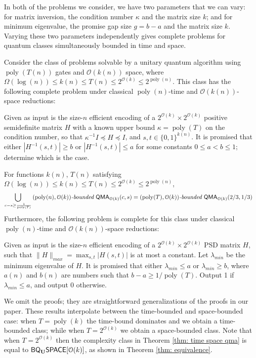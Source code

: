 \documentclass[a4paper,UKenglish]{lipics-v2016}
\newcommand\QMA{{\sf{QMA}}}
\newcommand\bddQMA[5]{{\left(#1,#2\right)}\textit{-bounded }\QMA_{#3}(#4,#5)}
\newcommand{\classfont}{\sf}
\newcommand{\Unitary}{\mathbf{U}}
\newcommand{\unitaryBQSPACE}[1]{{\classfont{BQ}_\Unitary\classfont{SPACE}}[#1]}
\newcommand\bigoh{\mathcal{O}}
\DeclareMathOperator{\poly}{poly}
\begin{document}
In both of the problems we consider, we have two parameters that we can vary: for matrix inversion, the condition number $\kappa$ and the matrix size $k$; and for minimum eigenvalue, the promise gap size $g=b-a$ and the matrix size $k$. Varying these two parameters independently gives complete problems for quantum classes simultaneously bounded in time and space.

\begin{theorem}
Consider the class of problems solvable by a unitary quantum algorithm using $\poly(T(n))$ gates and $\bigoh(k(n))$ space, where $\Omega(\log(n)) \le k(n) \le T(n) \le 2^{\bigoh(k)} \le 2^{\poly(n)}$. This class has the following complete problem under classical $\poly(n)$-time and $\bigoh(k(n))$-space reductions:

Given as input is the size-$n$ efficient encoding of a $2^{\bigoh(k)} \times 2^{\bigoh(k)}$ positive semidefinite matrix $H$ with a known upper bound $\kappa = \poly(T)$ on the condition number, so that $\kappa^{-1}I\preceq H \preceq I$, and $s,t\in \lbrace 0,1\rbrace^{k(n)}$. It is promised that either $|H^{-1}(s,t)|\geq b$
 or $|H^{-1}(s,t)|\leq a$ for some constants $0 \le a < b \le 1$; determine which is the case.
\end{theorem}

\begin{theorem} \label{thm: time space qma}
For functions $k(n)$, $T(n)$ satisfying $\Omega(\log(n)) \le k(n) \le T(n) \le 2^{\bigoh(k)} \le 2^{\poly(n)}$,
\begin{equation}
\bigcup_{c-s\ge \frac{1}{\poly(T)}} \bddQMA{\poly(n)}{\bigoh(k)}{\bigoh(k)}{c}{s} = \bddQMA{\poly(T)}{\bigoh(k)}{\bigoh(k)}{2/3}{1/3} \nonumber
\end{equation}
Furthermore, the following problem is complete for this class under classical $\poly(n)$-time and $\bigoh(k(n))$-space reductions:

Given as input is the size-$n$ efficient encoding of a $2^{\bigoh(k)} \times 2^{\bigoh(k)}$ PSD matrix $H$, such that 
$\|H\|_{max} = \max_{s,t}|H(s,t)|$ is at most a constant. Let $\lambda_{min}$ be the minimum eigenvalue of $H$. It is promised that either $\lambda_{min} \le a$ or $\lambda_{min} \ge b$, where $a(n)$ and $b(n)$ are numbers such that $b-a \ge 1/\poly(T)$. Output 1 if $\lambda_{min} \le a$, and output 0 otherwise.
\end{theorem}

We omit the proofs; they are straightforward generalizations of the proofs in our paper. These results interpolate between the time-bounded and space-bounded case: when $T = \poly(k)$ the time-bound dominates and we obtain a time-bounded class; while when $T = 2^{\bigoh(k)}$ we obtain a space-bounded class. Note that when $T = 2^{\bigoh(k)}$ then the complexity class in Theorem \ref{thm: time space qma} is equal to $\unitaryBQSPACE{\bigoh(k)}$, as shown in Theorem \ref{thm: equivalence}.
\end{document}
